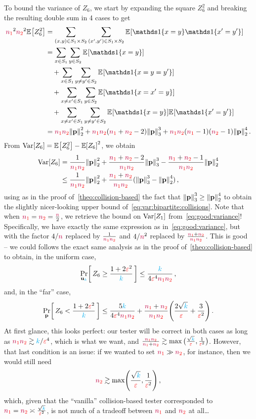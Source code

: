 To bound the variance of $Z_6$, we start by expanding the square $Z_6^2$ and breaking the resulting double sum in 4 cases to get
\begin{align*}
  \nss^2 \nst^2 \bEE{Z_6^2}
  &= \sum_{(x,y)\in S_1\times S_2}\sum_{(x',y')\in S_1\times S_2} \bEE{\indic{x=y}\indic{x'=y'}} \\
  &= \sum_{x\in S_1}\sum_{y\in S_2}\bEE{\indic{x=y}}\\
  &\quad+ \sum_{x\in S_1}\sum_{y\neq y'\in S_2}\bEE{\indic{x=y=y'}} \\
  &\quad+ \sum_{x\neq x'\in S_1}\sum_{y\in S_2}\bEE{\indic{x=x'=y}} \\
  &\quad+\sum_{x\neq x'\in S_1}\sum_{y \neq y'\in S_2} \bEE{\indic{x=y}}\bEE{\indic{x'=y'}}  \\
  &= \nss\nst \normtwo{\p}^2 + \nss \nst(\nss+\nst-2) \norm{\p}_3^3 + \nss\nst(\nss-1)(\nst-1) \normtwo{\p}^4\,.
\end{align*}
From $\Var[Z_6] = \bEE{Z_6^2} - \expect{Z_6}^2$, we obtain
\begin{align}
  \Var[Z_6] 
  &= \frac{1}{\nss\nst}\normtwo{\p}^2 + \frac{\nss+\nst-2}{\nss\nst}\norm{\p}_3^3 - \frac{\nss+\nst-1}{\nss\nst}\normtwo{\p}^4 \notag\\
  &\leq \frac{1}{\nss\nst}\normtwo{\p}^2 + \frac{\nss+\nst}{\nss\nst}(\norm{\p}_3^3-\normtwo{\p}^4) \label{eq:var:bipartite:collisions}\,,
\end{align}
using as in the proof of~\cref{theo:collision-based} the fact that $\norm{\p}_3^3 \geq \normtwo{\p}^4$ to obtain the slightly nicer-looking upper bound of~\cref{eq:var:bipartite:collisions}. Note that when $\textcolor{red}{{\textcolor{purple}{n}}_1}=\textcolor{red}{{\textcolor{purple}{n}}_2}=\frac{{\textcolor{purple}{n}}}{2}$, we retrieve the bound on $\operatorname{Var}[Z_1]$ from~\cref{eq:good:variance}! Specifically, we have exactly the same expression as in~\cref{eq:good:variance}, but with the factor $4/{\textcolor{purple}{n}}$ replaced by $\frac{1}{\textcolor{red}{{\textcolor{purple}{n}}_1}\textcolor{red}{{\textcolor{purple}{n}}_2}}$ and $4/{\textcolor{purple}{n}}^2$ replaced by $\frac{\textcolor{red}{{\textcolor{purple}{n}}_1}+\textcolor{red}{{\textcolor{purple}{n}}_2}}{\textcolor{red}{{\textcolor{purple}{n}}_1}\textcolor{red}{{\textcolor{purple}{n}}_2}}$. This is good -- we could follows the exact same analysis as in the proof of~\cref{theo:collision-based} to obtain, in the uniform case,
\[
  \probaDistrOf{\uniform_\ab}{ Z_6 \geq \frac{1+2\dst^2}{\ab} }
  \leq \frac{\ab}{4\dst^4\nss\nst}\,, 
\]
and, in the ``far'' case,
\begin{align}
  \label{eq:uniform:bipartite:firstattempt}
  \probaDistrOf{\p}{ Z_6 < \frac{1+2\dst^2}{\ab} }
  \leq \frac{5\ab}{4\dst^4\nss\nst} + \frac{\nss+\nst}{\nss\nst}\Paren{\frac{2\sqrt{\ab}}{\dst}+\frac{3}{\dst^2}}\,.
\end{align}
At first glance, this looks perfect: our tester will be correct in both cases as long as $\textcolor{red}{{\textcolor{purple}{n}}_1}\textcolor{red}{{\textcolor{purple}{n}}_2} \gtrsim {\textcolor{cyan}{k}}/\textcolor{red}{\varepsilon}^4$, which is what we want, and $\frac{\textcolor{red}{{\textcolor{purple}{n}}_1}\textcolor{red}{{\textcolor{purple}{n}}_2}}{\textcolor{red}{{\textcolor{purple}{n}}_1}+\textcolor{red}{{\textcolor{purple}{n}}_2}} \gtrsim \max\big(\frac{\sqrt{{\textcolor{cyan}{k}}}}{\textcolor{red}{\varepsilon}}, \frac{1}{\textcolor{red}{\varepsilon}^2}\big)$. However, that last condition is an issue: if we wanted to set $\textcolor{red}{{\textcolor{purple}{n}}_1}\gg \textcolor{red}{{\textcolor{purple}{n}}_2}$, for instance, then we would still need
\[
    \nst \gtrsim \max\Paren{\frac{\sqrt{\ab}}{\dst}, \frac{1}{\dst^2} }\,,
\]
which, given that the ``vanilla'' collision-based tester corresponded to $\textcolor{red}{{\textcolor{purple}{n}}_1}=\textcolor{red}{{\textcolor{purple}{n}}_2} \asymp \frac{\sqrt{{\textcolor{cyan}{k}}}}{\textcolor{red}{\varepsilon}^2}$, is not much of a tradeoff between $\textcolor{red}{{\textcolor{purple}{n}}_1}$ and $\textcolor{red}{{\textcolor{purple}{n}}_2}$ at all\dots

